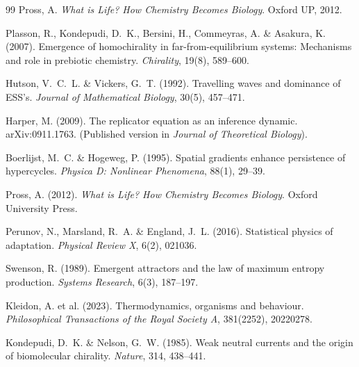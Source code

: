 \documentclass[12pt,a4paper]{article}
\theoremstyle{remark}
\begin{document}
\begin{thebibliography}{99}
Pross, A.
\newblock \textit{What is Life? How Chemistry Becomes Biology}.
\newblock Oxford UP, 2012.

Plasson, R., Kondepudi, D.~K., Bersini, H., Commeyras, A. \& Asakura, K. (2007).
\newblock Emergence of homochirality in far-from-equilibrium systems: Mechanisms and role in prebiotic chemistry.
\newblock \textit{Chirality}, 19(8), 589--600.

Hutson, V.~C.~L. \& Vickers, G.~T. (1992).
\newblock Travelling waves and dominance of ESS's.
\newblock \textit{Journal of Mathematical Biology}, 30(5), 457--471.

Harper, M. (2009).
\newblock The replicator equation as an inference dynamic.
\newblock arXiv:0911.1763. (Published version in \textit{Journal of Theoretical Biology}).

Boerlijst, M.~C. \& Hogeweg, P. (1995).
\newblock Spatial gradients enhance persistence of hypercycles.
\newblock \textit{Physica D: Nonlinear Phenomena}, 88(1), 29--39.

Pross, A. (2012).
\newblock \textit{What is Life? How Chemistry Becomes Biology}.
\newblock Oxford University Press.

Perunov, N., Marsland, R.~A. \& England, J.~L. (2016).
\newblock Statistical physics of adaptation.
\newblock \textit{Physical Review X}, 6(2), 021036.

Swenson, R. (1989).
\newblock Emergent attractors and the law of maximum entropy production.
\newblock \textit{Systems Research}, 6(3), 187--197.

Kleidon, A. et al. (2023).
\newblock Thermodynamics, organisms and behaviour.
\newblock \textit{Philosophical Transactions of the Royal Society A}, 381(2252), 20220278.

Kondepudi, D.~K. \& Nelson, G.~W. (1985).
\newblock Weak neutral currents and the origin of biomolecular chirality.
\newblock \textit{Nature}, 314, 438--441.


\end{thebibliography}
\end{document}
